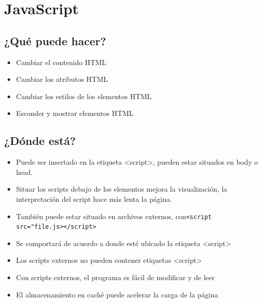 \documentclass{article}
\begin{document}
	\section{JavaScript}

  \subsection{¿Qué puede hacer?}

 \begin{itemize}
   \item Cambiar el contenido HTML
   \item Cambiar los atributos HTML
   \item Cambiar los estilos de los elementos HTML
   \item Esconder y mostrar elementos HTML
 \end{itemize}

 \subsection{¿Dónde está?}
 \begin{itemize}
   \item Puede ser insertado en la etiqueta <script>, pueden estar situados en body o head.
   \item Situar los scripts debajo de los elementos mejora la visualización, la interpretación del script hace más lenta la página.
   \item También puede estar situado en archivos externos, con\lstinline{<script src="file.js></script>}
   \item Se comportará de acuerdo a donde esté ubicado la etiqueta <script>
   \item Los scripts externos no pueden contener etiquetas <script>
   \item Con scripts externos, el programa es fácil de modificar y de leer
   \item El almacenamiento en caché puede acelerar la carga de la página
 \end{itemize}
\end{document}
